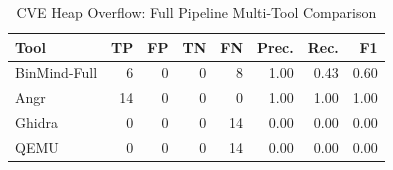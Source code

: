 \begin{table}[htbp]
\centering
\caption{CVE Heap Overflow: Full Pipeline Multi-Tool Comparison}
\label{tab:cve-full-comparison}
\begin{tabular}{lrrrrrrr}
\toprule
Tool & TP & FP & TN & FN & Prec. & Rec. & F1 \\
\midrule
BinMind-Full & 6 & 0 & 0 & 8 & 1.00 & 0.43 & 0.60 \\
Angr & 14 & 0 & 0 & 0 & 1.00 & 1.00 & 1.00 \\
Ghidra & 0 & 0 & 0 & 14 & 0.00 & 0.00 & 0.00 \\
QEMU & 0 & 0 & 0 & 14 & 0.00 & 0.00 & 0.00 \\
\bottomrule
\end{tabular}
\end{table}
